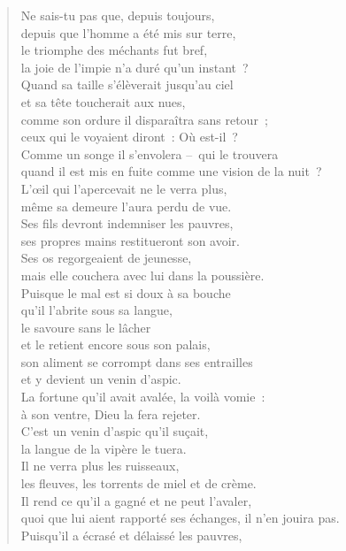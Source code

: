 \documentclass[french,twoside]{book} %
\begin{document}
\begin{verse}
Ne sais-tu pas que, depuis toujours, \\
depuis que l’homme a été mis sur terre,\\
le triomphe des méchants fut bref, \\
la joie de l’impie n’a duré qu’un instant ?\\
Quand sa taille s’élèverait jusqu’au ciel \\
et sa tête toucherait aux nues,\\
comme son ordure il disparaîtra sans retour ; \\
ceux qui le voyaient diront : Où est-il ?\\
Comme un songe il s’envolera – qui le trouvera \\
quand il est mis en fuite comme une vision de la nuit ?\\
L’œil qui l’apercevait ne le verra plus, \\
même sa demeure l’aura perdu de vue.\\
Ses fils devront indemniser les pauvres, \\
ses propres mains restitueront son avoir.\\
Ses os regorgeaient de jeunesse, \\
mais elle couchera avec lui dans la poussière.\\
Puisque le mal est si doux à sa bouche \\
qu’il l’abrite sous sa langue,\\
le savoure sans le lâcher \\
et le retient encore sous son palais,\\
son aliment se corrompt dans ses entrailles \\
et y devient un venin d’aspic.\\
La fortune qu’il avait avalée, la voilà vomie : \\
à son ventre, Dieu la fera rejeter.\\
C’est un venin d’aspic qu’il suçait, \\
la langue de la vipère le tuera.\\
Il ne verra plus les ruisseaux, \\
les fleuves, les torrents de miel et de crème.\\
Il rend ce qu’il a gagné et ne peut l’avaler, \\
quoi que lui aient rapporté ses échanges, il n’en jouira pas.\\
Puisqu’il a écrasé et délaissé les pauvres, \\

\end{verse}
\end{document}
